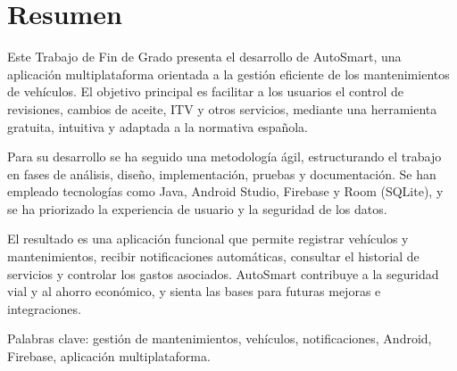 \chapter*{Resumen}

Este Trabajo de Fin de Grado presenta el desarrollo de AutoSmart, una aplicación multiplataforma orientada a la gestión eficiente de los mantenimientos de vehículos. El objetivo principal es facilitar a los usuarios el control de revisiones, cambios de aceite, ITV y otros servicios, mediante una herramienta gratuita, intuitiva y adaptada a la normativa española.

Para su desarrollo se ha seguido una metodología ágil, estructurando el trabajo en fases de análisis, diseño, implementación, pruebas y documentación. Se han empleado tecnologías como Java, Android Studio, Firebase y Room (SQLite), y se ha priorizado la experiencia de usuario y la seguridad de los datos.

El resultado es una aplicación funcional que permite registrar vehículos y mantenimientos, recibir notificaciones automáticas, consultar el historial de servicios y controlar los gastos asociados. AutoSmart contribuye a la seguridad vial y al ahorro económico, y sienta las bases para futuras mejoras e integraciones.

Palabras clave: gestión de mantenimientos, vehículos, notificaciones, Android, Firebase, aplicación multiplataforma. 